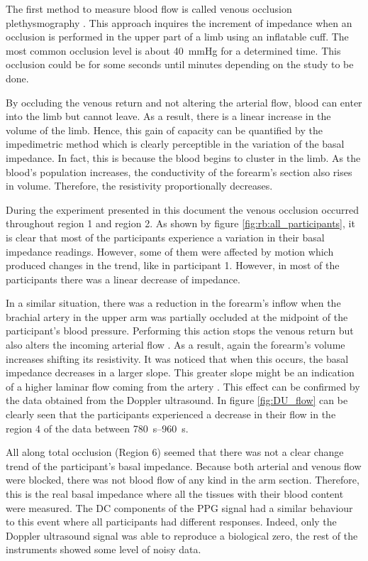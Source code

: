 The first method to measure blood flow is called venous occlusion plethysmography \cite{wilkinson2001venous}. This approach inquires the increment of impedance when an occlusion is performed in the upper part of a limb using an inflatable cuff. The most common occlusion level is about \SI{40}{\mmHg} for a determined time. This occlusion could be for some seconds until minutes depending on the study to be done. 

By occluding the venous return and not altering the arterial flow, blood can enter into the limb but cannot leave.  As a result, there is a linear increase in the volume of the limb. Hence, this gain of capacity can be quantified by the impedimetric method which is clearly perceptible in the variation of the basal impedance. In fact, this is because the blood begins to cluster in the limb. As the blood's population increases, the conductivity of the forearm's section also rises in volume. Therefore, the resistivity proportionally decreases. 

During the experiment presented in this document the venous occlusion occurred throughout region 1 and region 2.  As shown by figure \ref{fig:rb:all_participants}, it is clear that most of the participants experience a variation in their basal impedance readings.  However, some of them were affected by motion which produced changes in the trend, like in participant 1. However, in most of the participants there was a linear decrease of impedance. 

In a similar situation, there was a reduction in the forearm's inflow when the brachial artery in the upper arm was partially occluded at the midpoint of the participant's blood pressure. Performing this action stops the venous return but also alters the incoming arterial flow . As a result, again the forearm's volume increases shifting its resistivity. It was noticed that when this occurs, the basal impedance decreases in a larger slope. This greater slope might be an indication of a higher laminar flow coming from the artery . This effect can be confirmed by the data obtained from the Doppler ultrasound. In figure \ref{fig:DU_flow} can be clearly seen that the participants experienced a decrease in their flow in the region 4 of the data between \SIrange{780}{960}{\second}.   

All along total occlusion (Region 6) seemed that there was not a clear change trend of the participant's basal impedance.  Because both arterial and venous flow were blocked, there was not blood flow of any kind in the arm section. Therefore, this is the real basal impedance where all the tissues with their blood content were measured. The DC components of the PPG signal had a similar behaviour to this event where all participants had different responses. Indeed, only the Doppler ultrasound signal was able to reproduce a biological zero, the rest of the instruments showed some level of noisy data. 

